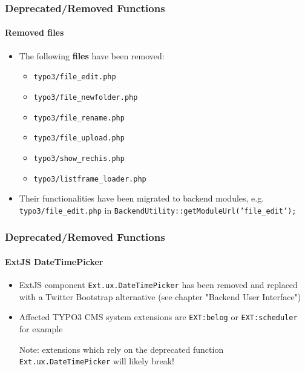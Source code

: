 \begin{frame}[fragile]
	\frametitle{Deprecated/Removed Functions}
	\framesubtitle{Removed files}

	\begin{itemize}
		\item The following \textbf{files} have been removed:

			\begin{itemize}
				\item \texttt{typo3/file\_edit.php}
				\item \texttt{typo3/file\_newfolder.php}
				\item \texttt{typo3/file\_rename.php}
				\item \texttt{typo3/file\_upload.php}
				\item \texttt{typo3/show\_rechis.php}
				\item \texttt{typo3/listframe\_loader.php}
			\end{itemize}

		\item Their functionalities have been migrated to backend modules,
			e.g. \texttt{typo3/file\_edit.php} in \texttt{BackendUtility::getModuleUrl('file\_edit');}

	\end{itemize}

\end{frame}


\begin{frame}[fragile]
	\frametitle{Deprecated/Removed Functions}
	\framesubtitle{ExtJS DateTimePicker}

	\begin{itemize}

		\item ExtJS component \texttt{Ext.ux.DateTimePicker} has been removed and replaced
			with a Twitter Bootstrap alternative (see chapter "Backend User Interface")

		\item Affected TYPO3 CMS system extensions are \texttt{EXT:belog} or
			\texttt{EXT:scheduler} for example

			\vspace{0.2cm}

			\begingroup
				\color{red}
					Note: extensions which rely on the deprecated function
					\texttt{Ext.ux.DateTimePicker} will likely break!
			\endgroup

	\end{itemize}

\end{frame}

